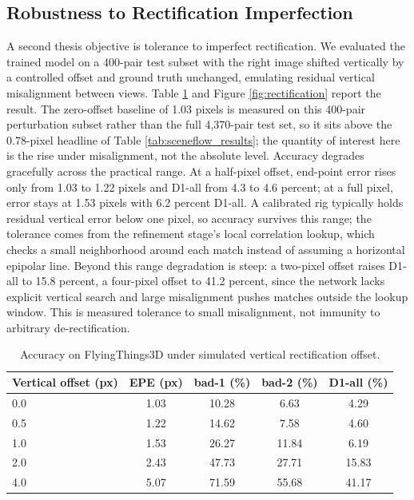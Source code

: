 \subsection{Robustness to Rectification Imperfection}
\label{sec:rectification}
A second thesis objective is tolerance to imperfect rectification. We
evaluated the trained model on a 400-pair test subset with the right
image shifted vertically by a controlled offset and ground truth
unchanged, emulating residual vertical misalignment between views.
Table \ref{tab:rectification} and Figure \ref{fig:rectification}
report the result. The zero-offset baseline of 1.03 pixels is measured
on this 400-pair perturbation subset rather than the full 4,370-pair
test set, so it sits above the 0.78-pixel headline of Table
\ref{tab:sceneflow_results}; the quantity of interest here is the rise
under misalignment, not the absolute level. Accuracy degrades
gracefully across the practical range. At a half-pixel offset,
end-point error rises only from 1.03 to 1.22 pixels and D1-all from
4.3 to 4.6 percent; at a full pixel, error stays at 1.53 pixels with
6.2 percent D1-all. A calibrated rig typically holds residual vertical
error below one pixel, so accuracy survives this range; the tolerance
comes from the refinement stage's local correlation lookup, which
checks a small neighborhood around each match instead of assuming a
horizontal epipolar line. Beyond this range degradation is steep: a
two-pixel offset raises D1-all to 15.8 percent, a four-pixel offset to
41.2 percent, since the network lacks explicit vertical search and
large misalignment pushes matches outside the lookup window. This is
measured tolerance to small misalignment, not immunity to arbitrary
de-rectification.

\begin{table}[!htbp]
\centering
\caption{Accuracy on FlyingThings3D under simulated vertical rectification offset.}
\label{tab:rectification}
\small
\begin{tabular}{lcccc}
\toprule
Vertical offset (px) & EPE (px) & bad-1 (\%) & bad-2 (\%) & D1-all (\%)\\
\midrule
0.0 & 1.03 & 10.28 & 6.63 & 4.29\\
0.5 & 1.22 & 14.62 & 7.58 & 4.60\\
1.0 & 1.53 & 26.27 & 11.84 & 6.19\\
2.0 & 2.43 & 47.73 & 27.71 & 15.83\\
4.0 & 5.07 & 71.59 & 55.68 & 41.17\\
\bottomrule
\end{tabular}
\end{table}

